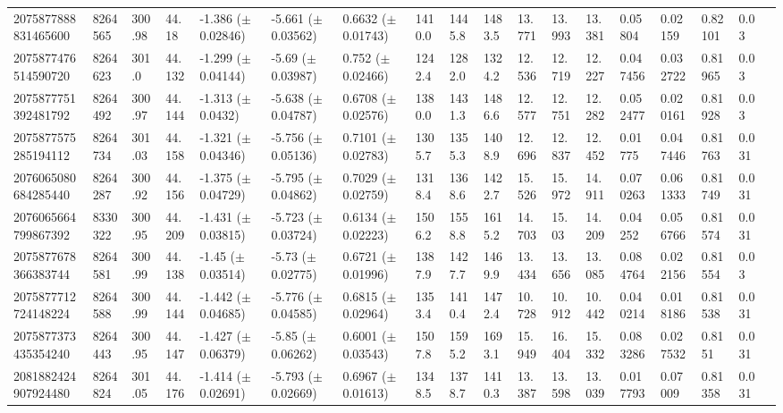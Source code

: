 \begin{sidewaystable}[htbp]
{\begin{tabular}{llllllllllllllllll}
        2075877888831465600 & 8264565 & 300.98 & 44.18 & -1.386 ($\pm$ 0.02846) & -5.661 ($\pm$ 0.03562) & 0.6632 ($\pm$ 0.01743) & 1410.0 & 1445.8 & 1483.5 & 13.771 & 13.993 & 13.381 & 0.05804 & 0.02159 & 0.82101 & 0.03 & \\
        2075877476514590720 & 8264623 & 301.0 & 44.132 & -1.299 ($\pm$ 0.04144) & -5.69 ($\pm$ 0.03987) & 0.752 ($\pm$ 0.02466) & 1242.4 & 1282.0 & 1324.2 & 12.536 & 12.719 & 12.227 & 0.047456 & 0.032722 & 0.81965 & 0.03 & \\
        2075877751392481792 & 8264492 & 300.97 & 44.144 & -1.313 ($\pm$ 0.0432) & -5.638 ($\pm$ 0.04787) & 0.6708 ($\pm$ 0.02576) & 1380.0 & 1431.3 & 1486.6 & 12.577 & 12.751 & 12.282 & 0.052477 & 0.020161 & 0.81928 & 0.03 & \\
        2075877575285194112 & 8264734 & 301.03 & 44.158 & -1.321 ($\pm$ 0.04346) & -5.756 ($\pm$ 0.05136) & 0.7101 ($\pm$ 0.02783) & 1305.7 & 1355.3 & 1408.9 & 12.696 & 12.837 & 12.452 & 0.01775 & 0.047446 & 0.81763 & 0.031 & \\
        2076065080684285440 & 8264287 & 300.92 & 44.156 & -1.375 ($\pm$ 0.04729) & -5.795 ($\pm$ 0.04862) & 0.7029 ($\pm$ 0.02759) & 1318.4 & 1368.6 & 1422.7 & 15.526 & 15.972 & 14.911 & 0.070263 & 0.061333 & 0.81749 & 0.031 & \\
        2076065664799867392 & 8330322 & 300.95 & 44.209 & -1.431 ($\pm$ 0.03815) & -5.723 ($\pm$ 0.03724) & 0.6134 ($\pm$ 0.02223) & 1506.2 & 1558.8 & 1615.2 & 14.703 & 15.03 & 14.209 & 0.04252 & 0.056766 & 0.81574 & 0.031 & \\
        2075877678366383744 & 8264581 & 300.99 & 44.138 & -1.45 ($\pm$ 0.03514) & -5.73 ($\pm$ 0.02775) & 0.6721 ($\pm$ 0.01996) & 1387.9 & 1427.7 & 1469.9 & 13.434 & 13.656 & 13.085 & 0.084764 & 0.022156 & 0.81554 & 0.03 & \\
        2075877712724148224 & 8264588 & 300.99 & 44.144 & -1.442 ($\pm$ 0.04685) & -5.776 ($\pm$ 0.04585) & 0.6815 ($\pm$ 0.02964) & 1353.4 & 1410.4 & 1472.4 & 10.728 & 10.912 & 10.442 & 0.040214 & 0.018186 & 0.81538 & 0.031 & \\
        2075877373435354240 & 8264443 & 300.95 & 44.147 & -1.427 ($\pm$ 0.06379) & -5.85 ($\pm$ 0.06262) & 0.6001 ($\pm$ 0.03543) & 1507.8 & 1595.2 & 1693.1 & 15.949 & 16.404 & 15.332 & 0.083286 & 0.027532 & 0.8151 & 0.031 & \\
        2081882424907924480 & 8264824 & 301.05 & 44.176 & -1.414 ($\pm$ 0.02691) & -5.793 ($\pm$ 0.02669) & 0.6967 ($\pm$ 0.01613) & 1348.5 & 1378.7 & 1410.3 & 13.387 & 13.598 & 13.039 & 0.017793 & 0.07009 & 0.81358 & 0.031 & \\

\end{tabular}}
\end{sidewaystable}
